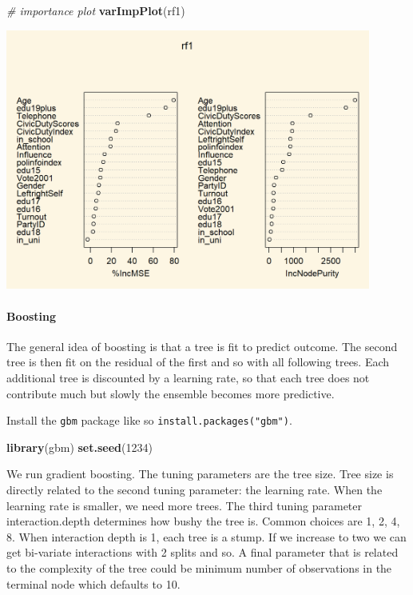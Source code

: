 \documentclass[]{article}
\newenvironment{Shaded}{\begin{snugshade}}{\end{snugshade}}
\newcommand{\CommentTok}[1]{\textcolor[rgb]{0.56,0.35,0.01}{\textit{#1}}}
\newcommand{\DecValTok}[1]{\textcolor[rgb]{0.00,0.00,0.81}{#1}}
\newcommand{\KeywordTok}[1]{\textcolor[rgb]{0.13,0.29,0.53}{\textbf{#1}}}
\newcommand{\NormalTok}[1]{#1}
\let\oldparagraph\paragraph
\renewcommand{\paragraph}[1]{\oldparagraph{#1}\mbox{}}
\begin{document}
\begin{Shaded}
\begin{Highlighting}[]
\CommentTok{# importance plot}
\KeywordTok{varImpPlot}\NormalTok{(rf1)}
\end{Highlighting}
\end{Shaded}

\includegraphics[width=0.9\textwidth,height=\textheight]{./img/unnamed-chunk-163-1.png}

\hypertarget{boosting}{%
\paragraph{Boosting}\label{boosting}}

The general idea of boosting is that a tree is fit to predict outcome. The second tree is then fit on the residual of the first and so with all following trees. Each additional tree is discounted by a learning rate, so that each tree does not contribute much but slowly the ensemble becomes more predictive.

Install the \texttt{gbm} package like so \texttt{install.packages("gbm")}.

\begin{Shaded}
\begin{Highlighting}[]
\KeywordTok{library}\NormalTok{(gbm)}
\KeywordTok{set.seed}\NormalTok{(}\DecValTok{1234}\NormalTok{)}
\end{Highlighting}
\end{Shaded}

We run gradient boosting. The tuning parameters are the tree size. Tree size is directly related to the second tuning parameter: the learning rate. When the learning rate is smaller, we need more trees. The third tuning parameter interaction.depth determines how bushy the tree is. Common choices are 1, 2, 4, 8. When interaction depth is 1, each tree is a stump. If we increase to two we can get bi-variate interactions with 2 splits and so. A final parameter that is related to the complexity of the tree could be minimum number of observations in the terminal node which defaults to 10.
\end{document}
